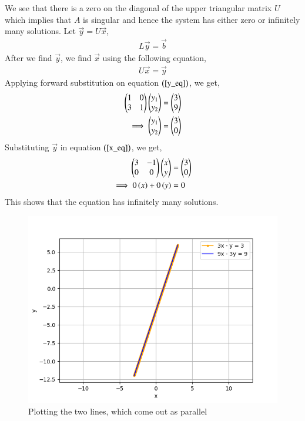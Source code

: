 \documentclass[journal]{IEEEtran}
\begin{document}
We see that there is a zero on the diagonal of the upper triangular matrix $U$ which implies that $A$ is singular and hence the system has either zero or infinitely many solutions.
\newline
Let $\vec{y} = U\vec{x}$,
\begin{align}
    L\vec{y} = \vec{b} \label{y_eq}
\end{align}
After we find $\vec{y}$, we find $\vec{x}$ using the following equation,
\begin{align}
    U\vec{x} = \vec{y} \label{x_eq}
\end{align}
Applying forward substitution on equation $\left(\ref{y_eq}\right)$, we get,
\begin{align}
    \begin{pmatrix}1 & 0\\3 & 1\end{pmatrix}\begin{pmatrix}y_1\\y_2\end{pmatrix} &= \begin{pmatrix}3\\9\end{pmatrix}\\
    \implies \begin{pmatrix}y_1\\y_2\end{pmatrix} &= \begin{pmatrix}3\\0\end{pmatrix}
\end{align}
Substituting $\vec{y}$ in equation $\left(\ref{x_eq}\right)$, we get,
\begin{align}
    \begin{pmatrix}3 & -1\\0 & 0\end{pmatrix} \begin{pmatrix}x\\y\end{pmatrix} &= \begin{pmatrix}3\\0\end{pmatrix}\\
    \implies 0\left(x\right) + 0\left(y\right) &= 0
\end{align}
This shows that the equation has infinitely many solutions.
\begin{figure}[h!]
  \centering
  \includegraphics[width=0.7\columnwidth]{figs/graph.png}
  \caption{Plotting the two lines, which come out as parallel}
  \label{label}
\end{figure}
\end{document}
